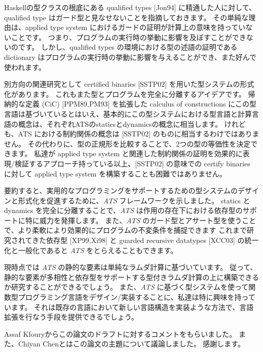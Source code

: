 \documentclass[submit,techreq,noauthor,onecolumn]{ipsj}
\begin{document}
Haskellの型クラスの根底にある qualified types [Jon94] に精通した人に対して、qualified type はガード型と見なせないことを指摘しておきます。
その単純な理由は、applied type system におけるガードの証明が計算上の意味を持っていないことです。
つまり、プログラムの実行時の挙動に影響を及ぼすことができないのです。
しかし、qualified types の環境における型の述語の証明である dictionary はプログラムの実行時の挙動に影響を与えることができ、また好んで使われます。

別方向の関連研究として certified binaries [SSTP02] を用いた型システムの形式化があります。
これもまた型とプログラムを完全に分離するアイデアです。
帰納的な定義 (CiC) [PPM89,PM93] を拡張した calculus of constructions にこの型言語は基づいているとはいえ、基本的にこの型システムにおける型言語と計算言語の概念は、それぞれATSのstaticsとdynamicsの概念に相当します。
けれども、ATS における制約関係の概念は [SSTP02] のものに相当するわけではありません。
その代わりに、型の正規形を比較することで、2つの型の等価性を決定できます。
私達が applied type system と関連した制約関係の証明を効果的に表現/検証するアプローチ持っている以上、[SSTP02] の意味での certify binaries に対して applied type system を構築することも困難ではありません。

要約すると、実用的なプログラミングをサポートするための型システムのデザインと形式化を促進するために、{\it ATS} フレームワークを示しました。
statics と dynamics を完全に分離することで、{\it ATS} は作用の存在下における依存型のサポートに特に威力を発揮します。
また、{\it ATS} のガード型とアサート型を使うことで、より柔軟により効果的にプログラムの不変条件を捕捉できます
これまで研究されてきた依存型 [XP99,Xi98] と guarded recursive datatypes [XCC03] の統一化と一般化であると {\it ATS} をとらえることもできます。

現時点では {\it ATS} の静的な要素は単純なラムダ計算に基づいています。
従って、静的な要素が多相性と依存型をサポートする型付きラムダ計算の上に構築できるか研究することができるでしょう。
また、{\it ATS} に基づく型システムを使って関数型プログラミング言語をデザイン/実装することに、私達は特に興味を持っています。
それは既存の言語において新しい言語構造を実装ような方法で、言語拡張を行なう手段を提供できるでしょう。

\begin{acknowledgment}
Assaf Kfouryからこの論文のドラフトに対するコメントをもらいました。
また、Chiyan Chenとはこの論文の主題について議論しました。
感謝します。
\end{acknowledgment}

\end{document}
